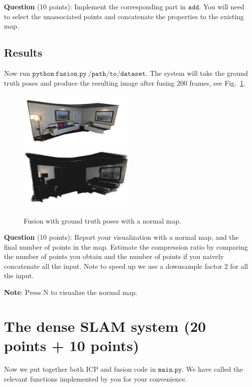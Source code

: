\documentclass[12pt, a4paper]{article}
\begin{document}
\textbf{Question} (10 points): Implement the corresponding part in $\mathtt{add}$. You will need to select the unassociated points and concatenate the properties to the existing map.

\subsection{Results}
Now run $\mathtt{python~fusion.py~/path/to/dataset}$. The system will take the ground truth poses and produce the resulting image after fusing 200 frames, see Fig.~\ref{fig:fusion-gt}.
\begin{figure}
	\includegraphics[width=0.5\textwidth]{figures/fusion_gt.png}
	\includegraphics[width=0.5\textwidth]{figures/fusion_gt_normal.png}
	\caption{Fusion with ground truth poses with a normal map.}\label{fig:fusion-gt}
\end{figure}

\textbf{Question} (10 points): Report your visualization with a normal map, and the final number of points in the map. Estimate the compression ratio by comparing the number of points you obtain and the number of points if you naively concatenate all the input. Note to speed up we use a downsample factor 2 for all the input.

\textbf{Note}: Press N to visualize the normal map.

\section{The dense SLAM system (20 points + 10 points)}
Now we put together both ICP and fusion code in $\mathtt{main.py}$. We have called the relevant functions implemented by you for your convenience.
\end{document}
